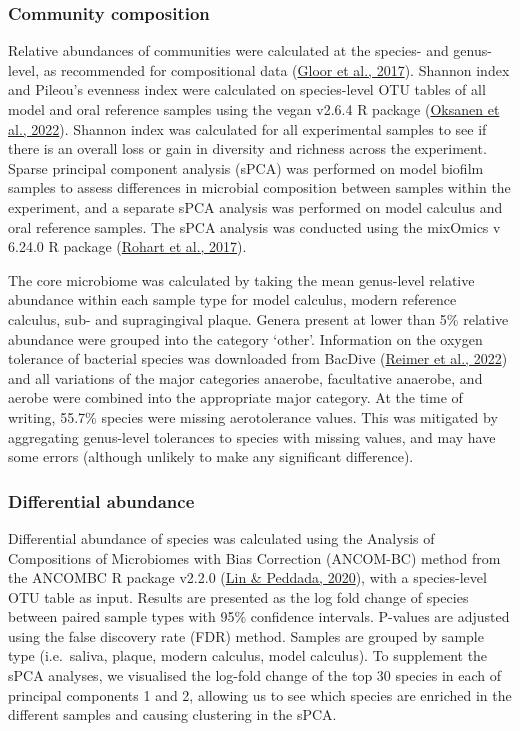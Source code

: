 \documentclass[
  letterpaper,
]{book}
\begin{document}
\hypertarget{community-composition}{%
\subsubsection{Community composition}\label{community-composition}}

Relative abundances of communities were calculated at the species- and
genus-level, as recommended for compositional data
(\protect\hyperlink{ref-gloorMicrobiomeDatasets2017}{Gloor et al.,
2017}). Shannon index and Pileou's evenness index were calculated on
species-level OTU tables of all model and oral reference samples using
the vegan v2.6.4 R package (\protect\hyperlink{ref-Rvegan}{Oksanen et
al., 2022}). Shannon index was calculated for all experimental samples
to see if there is an overall loss or gain in diversity and richness
across the experiment. Sparse principal component analysis (sPCA) was
performed on model biofilm samples to assess differences in microbial
composition between samples within the experiment, and a separate sPCA
analysis was performed on model calculus and oral reference samples. The
sPCA analysis was conducted using the mixOmics v 6.24.0 R package
(\protect\hyperlink{ref-RmixOmics}{Rohart et al., 2017}).

The core microbiome was calculated by taking the mean genus-level
relative abundance within each sample type for model calculus, modern
reference calculus, sub- and supragingival plaque. Genera present at
lower than 5\% relative abundance were grouped into the category
`other'. Information on the oxygen tolerance of bacterial species was
downloaded from BacDive
(\protect\hyperlink{ref-reimerBacDive2022}{Reimer et al., 2022}) and all
variations of the major categories anaerobe, facultative anaerobe, and
aerobe were combined into the appropriate major category. At the time of
writing, 55.7\% species were missing aerotolerance values. This was
mitigated by aggregating genus-level tolerances to species with missing
values, and may have some errors (although unlikely to make any
significant difference).

\hypertarget{differential-abundance}{%
\subsubsection{Differential abundance}\label{differential-abundance}}

Differential abundance of species was calculated using the Analysis of
Compositions of Microbiomes with Bias Correction (ANCOM-BC) method from
the ANCOMBC R package v2.2.0 (\protect\hyperlink{ref-linANCOMBC2020}{Lin
\& Peddada, 2020}), with a species-level OTU table as input. Results are
presented as the log fold change of species between paired sample types
with 95\% confidence intervals. P-values are adjusted using the false
discovery rate (FDR) method. Samples are grouped by sample type
(i.e.~saliva, plaque, modern calculus, model calculus). To supplement
the sPCA analyses, we visualised the log-fold change of the top 30
species in each of principal components 1 and 2, allowing us to see
which species are enriched in the different samples and causing
clustering in the sPCA.
\end{document}
